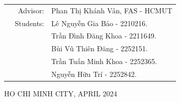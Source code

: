 \documentclass[12pt]{article}
\begin{document}
\begin{titlepage}
\begin{table}[h]
	\begin{tabular}{rrl}
		\hspace{5 cm} & Advisor: & Phan Thị Khánh Vân,\hspace*{5pt} FAS - HCMUT\\[6pt]
		& Students: & Lê Nguyễn Gia Bảo \hspace*{15pt} - 2210216. \\
		& 			& Trần Đình Đăng Khoa \hspace*{0pt} - 2211649. \\
		& 			& Bùi Vũ Thiên Đăng	  \hspace*{15pt} - 2252151. \\
		& 			& Trần Tuấn Minh Khoa 	  \hspace*{0pt} - 2252365. \\
		& 			& Nguyễn Hữu Trí		  \hspace*{33pt} - 2252842. \\
	\end{tabular}
\end{table}

\vspace*{1cm}

\begin{center}
{\footnotesize HO CHI MINH CITY, APRIL 2024}
\end{center}
\end{titlepage}


\newpage
\tableofcontents

% 






\clearpage


\nocite{*}
\end{document}
